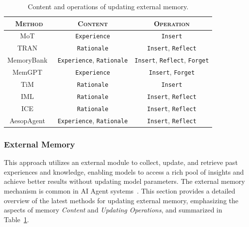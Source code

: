 \documentclass[sn-basic, Numbered]{sn-jnl}%
\theoremstyle{thmstyleone}%
\theoremstyle{thmstyletwo}%
\theoremstyle{thmstylethree}%
\begin{document}
\begin{table}
\centering %
\setlength{\tabcolsep}{3mm}
\begin{tabular}{ccc}
\toprule %
\textsc{Method} & \textsc{Content} & \textsc{Operation} \\
\midrule
MoT~\cite{li2023mot} 
& \texttt{Experience} & \texttt{Insert} \\
TRAN~\cite{yang2023failures}
& \texttt{Rationale} & \texttt{Insert}, \texttt{Reflect}  \\
MemoryBank~\cite{zhong2024memorybank}
& \texttt{Experience}, \texttt{Rationale} & \texttt{Insert}, \texttt{Reflect}, \texttt{Forget} \\
MemGPT~\cite{packer2023memgpt} 
& \texttt{Experience} & \texttt{Insert}, \texttt{Forget} \\
TiM~\cite{liu2023think} 
& \texttt{Rationale} & \texttt{Insert} \\
IML~\cite{wang2024memory} 
& \texttt{Rationale} & \texttt{Insert}, \texttt{Reflect} \\
ICE~\cite{qian2024investigate}
& \texttt{Rationale} & \texttt{Insert}, \texttt{Reflect} \\
AesopAgent~\cite{wang2024aesopagent}
& \texttt{Experience}, \texttt{Rationale} & \texttt{Insert}, \texttt{Reflect} \\
\bottomrule 
\end{tabular}
\caption{Content and operations of updating external memory.} 
\label{tab:memory} 
\end{table}





\subsubsection{External Memory} 
This approach utilizes an external module to collect, update, and retrieve past experiences and knowledge, enabling models to access a rich pool of insights and achieve better results without updating model parameters. The external memory mechanism is common in AI Agent systems~\cite{xu2023exploring, qian2024investigate, wang2024aesopagent}.
This section provides a detailed overview of the latest methods for updating external memory, emphasizing the aspects of memory \textit{Content} and \textit{Updating Operations}, and summarized in Table~\ref{tab:memory}.
\end{document}
